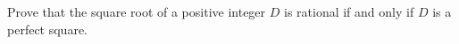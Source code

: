 Prove that the square root of a positive integer $D$ is rational if and only if $D$ is a perfect square.

